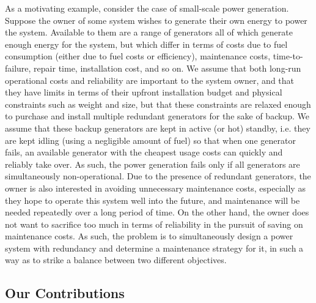 \documentclass[11pt,authoryear,a4paper]{article}
\theoremstyle{definition}
\begin{document}
{\color{black}
As a motivating example, consider the case of small-scale power generation. Suppose the owner of some system wishes to generate their own energy to power the system. Available to them are a range of generators all of which generate enough energy for the system, but which differ in terms of costs due to fuel consumption (either due to fuel costs or efficiency), maintenance costs, time-to-failure, repair time, installation cost, and so on. We assume that both long-run operational costs and reliability are important to the system owner, and that they have limits in terms of their upfront installation budget and physical constraints such as weight and size, but that these constraints are relaxed enough to purchase and install multiple redundant generators for the sake of backup. We assume that these backup generators are kept in active (or hot) standby, i.e. they are kept idling (using a negligible amount of fuel) so that when one generator fails, an available generator with the cheapest usage costs can quickly and reliably take over. As such, the power generation fails only if all generators are simultaneously non-operational. Due to the presence of redundant generators, the owner is also interested in avoiding unnecessary maintenance costs, especially as they hope to operate this system well into the future, and maintenance will be needed repeatedly over a long period of time. On the other hand, the owner does not want to sacrifice too much in terms of reliability in the pursuit of saving on maintenance costs. As such, the problem is to simultaneously design a power system with redundancy and determine a maintenance strategy for it, in such a way as to strike a balance between two different objectives.
}


\subsection{Our Contributions}

\end{document}
